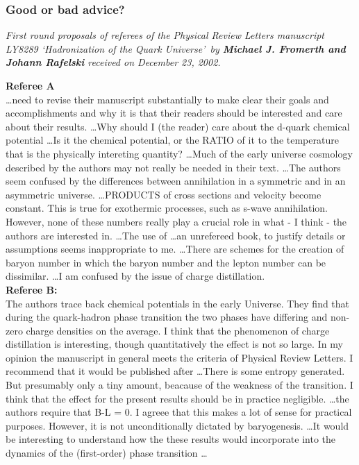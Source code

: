 \subsubsection{Good or bad advice?}
\noindent\textit{First round proposals of referees of the  Physical Review Letters manuscript LY8289 \lq Hadronization of the Quark Universe\rq\  by \textbf{Michael J. Fromerth and Johann Rafelski} received  on December 23,  2002.}\\[-0.7cm]
%
\begin{mdframed}[linecolor=gray,roundcorner=12pt,backgroundcolor=GreenYellow!15,linewidth=1pt,leftmargin=0cm,rightmargin=0cm,topline=true,bottomline=true,skipabove=12pt]\relax%
% 
\textbf{Referee A}\\
\indent \ldots need to revise their manuscript substantially to make clear their goals and accomplishments and why it is that their readers should be interested and care about their results. \ldots  Why should I (the reader) care about the d-quark chemical potential \ldots Is it the chemical potential, or the RATIO of it to the temperature that is the physically intereting quantity? \ldots  Much of the early universe cosmology described by the authors may not really be needed in their text. \ldots The authors seem confused by the differences between annihilation in a symmetric and in an asymmetric universe. \ldots PRODUCTS of cross sections and velocity become constant. This is true for exothermic processes, such as s-wave annihilation. However, none of these numbers really play a crucial role in what - I think - the authors are interested in. \ldots The use of \ldots  an unrefereed book, to justify details or assumptions seems inappropriate to me. \ldots There are schemes for the creation of baryon number in which the baryon number and the lepton number can be dissimilar. \ldots  I am confused by the issue of charge distillation.\\

\noindent\textbf{Referee B:}\\
\indent The authors trace back chemical potentials in the early Universe. They find that during the quark-hadron phase transition the two phases have differing and non-zero charge densities on the average. I think that the phenomenon of charge distillation is interesting, though quantitatively the effect is not so large. In my opinion the manuscript in general meets the criteria of Physical Review Letters. I recommend that it would be published after \ldots  There is some entropy generated. But presumably only a tiny amount, beacause of the weakness of the transition. I think that the effect for the present results should be in practice negligible. \ldots  the authors require that B-L = 0. I agreee that this makes a lot of sense for practical purposes. However, it is not unconditionally dictated by baryogenesis. \ldots It would be interesting to understand how the these results would incorporate into the dynamics of the (first-order) phase transition \ldots
\end{mdframed}
\vskip 0.5cm 


